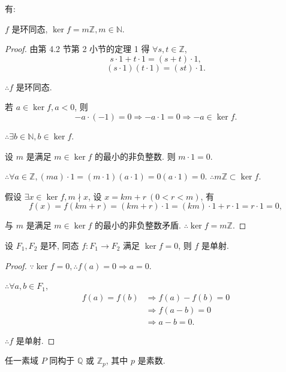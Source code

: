 \documentclass[color=black,device=normal,lang=cn,mode=geye]{elegantnote}
\begin{document}
有:
\begin{lemma}\label{l3.1}
    $f$ 是环同态, $\ker f=m\mathbb{Z},m\in\mathbb{N}$.
\end{lemma}
\begin{proof}
    由第 4.2 节第 2 小节的定理 1 得
    $\forall s,t\in\mathbb{Z}$,
    \[s\cdot1+t\cdot1=(s+t)\cdot1,\]
    \[(s\cdot1)(t\cdot1)=(st)\cdot1.\]

    $\therefore f$ 是环同态.

    若 $a\in\ker f,a<0$, 则
    \[-a\cdot(-1)=0\Rightarrow-a\cdot1=0\Rightarrow-a\in\ker f.\]

    $\therefore\exists b\in\mathbb{N},b\in\ker f$.

    设 $m$ 是满足 $m\in\ker f$ 的最小的非负整数. 则 $m\cdot1=0$.

    $\therefore\forall a\in\mathbb{Z},(ma)\cdot1=(m\cdot1)(a\cdot1)=0(a\cdot1)=0$. $\therefore m\mathbb{Z}\subset\ker f$.

    假设 $\exists x\in\ker f,m\nmid x$, 设 $x=km+r\ (0<r<m)$, 有
    \[f(x)=f(km+r)=(km+r)\cdot1=(km)\cdot1+r\cdot1=r\cdot 1=0,\]

    与 $m$ 是满足 $m\in\ker f$ 的最小的非负整数矛盾. $\therefore\ker f=m\mathbb{Z}$.
\end{proof}
\begin{lemma}\label{l3.2}
    设 $F_1,F_2$ 是环, 同态 $f:F_1\to F_2$ 满足 $\ker f=0$, 则 $f$ 是单射.
\end{lemma}
\begin{proof}
    $\because\ker f=0,\therefore f(a)=0\Rightarrow a=0$.

    $\therefore\forall a,b\in F_1$,
    \begin{align*}
        f(a)=f(b) & \Rightarrow f(a)-f(b)=0 \\
        & \Rightarrow f(a-b)=0 \\
        & \Rightarrow a-b=0.
    \end{align*}

    $\therefore f$ 是单射.
\end{proof}
\begin{theorem}
    任一素域 $P$ 同构于 $\mathbb{Q}$ 或 $\mathbb{Z}_p$, 其中 $p$ 是素数.
\end{theorem}
\end{document}
